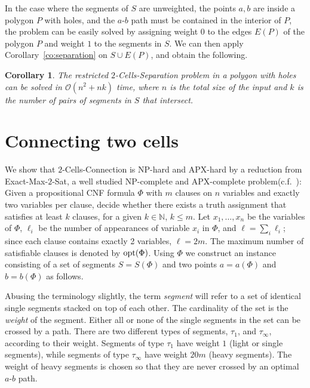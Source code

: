 \documentclass[11pt,a4paper]{article}
\newtheorem{corollary}[definition]{Corollary}
\begin{document}
In the case where the segments of $S$ are unweighted, the points $a, b$ are inside a polygon $P$ with holes, and the $a$-$b$ path must be contained in the interior of $P$, the problem can be easily solved by 
assigning weight 0 to the edges $E(P)$ of the polygon $P$
and weight $1$ to the segments in $S$. 
We can then apply Corollary~\ref{co:separation} on $S\cup E(P)$, and obtain the following.

\begin{corollary}
The restricted {\sc $2$-Cells-Separation} problem in a polygon with holes can be solved in $\mathcal{O}(n^2+nk)$ time, where $n$ is the total size of the input
and $k$ is the number of pairs of segments in $S$ that intersect.
\end{corollary}



\section{Connecting two cells}
\label{2cells}

We show that {\sc $2$-Cells-Connection} is NP-hard and APX-hard by a reduction from {\sc Exact-Max-$2$-Sat}, a well studied NP-complete and APX-complete problem(c.f.~\cite{Hastad01}):
Given a propositional CNF formula $\Phi$ with $m$ clauses on $n$ variables and exactly two variables per clause, decide whether there exists a truth assignment that satisfies at least $k$ clauses, for a given $k\in\mathbb{N}$, $k\leq m$.
Let $x_1,\dots,x_n$ be the variables of $\Phi$, $\ell_i$ be the number of appearances of variable $x_i$ in $\Phi$, and $\ell= \sum_i \ell_i$; since each clause contains exactly 2 variables, $\ell=2m$. The maximum number of satisfiable clauses is denoted by ${\rm opt}(\Phi)$.
Using $\Phi$ we construct an instance consisting of a set of segments $S=S(\Phi)$ and two points $a=a(\Phi)$ and $b=b(\Phi)$ as follows.

Abusing the terminology slightly, the term \emph{segment} will refer to a set of identical single segments stacked on top of each other. The cardinality of the set is the \emph{weight} of the segment. Either all or none of the single segments in the set can be crossed by a path. 
There are two different types of segments, $\tau_1$, and $\tau_{\infty}$, according to their weight. Segments of type $\tau_1$ have weight $1$ (light or single segments), while segments of type $\tau_{\infty}$ have weight $20m$ (heavy segments). The weight of heavy segments is chosen so that they are never crossed by an optimal $a$-$b$ path.
\end{document}
